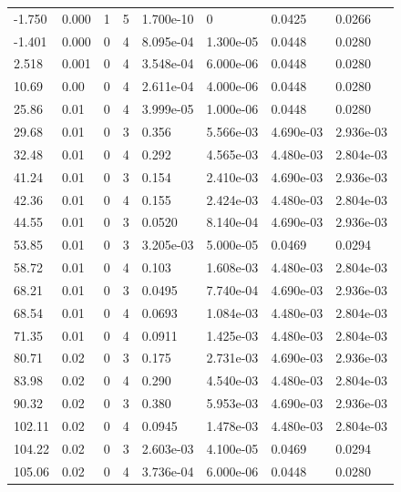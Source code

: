 \documentclass[preview]{standalone}
\begin{document}
{{\begin{tabular}{L{1.2cm}C{1.2cm} C{0.3cm}C{0.5cm} C{1.4cm}C{1.4cm} C{1.4cm}C{1.4cm}}
  -1.750  &  0.000  & 1     &  5 &  1.700e-10  & 0  & 0.0425 &  0.0266   \\ 
  -1.401  &  0.000  & 0     &  4 &  8.095e-04  & 1.300e-05  & 0.0448 &  0.0280   \\ 
  2.518  &  0.001  & 0     &  4 &  3.548e-04  & 6.000e-06  & 0.0448 &  0.0280   \\ 
  10.69  &  0.00  & 0     &  4 &  2.611e-04  & 4.000e-06  & 0.0448 &  0.0280   \\ 
  25.86  &  0.01  & 0     &  4 &  3.999e-05  & 1.000e-06  & 0.0448 &  0.0280   \\ 
  29.68  &  0.01  & 0     &  3 &  0.356  & 5.566e-03  & 4.690e-03 &  2.936e-03   \\ 
  32.48  &  0.01  & 0     &  4 &  0.292  & 4.565e-03  & 4.480e-03 &  2.804e-03   \\ 
  41.24  &  0.01  & 0     &  3 &  0.154  & 2.410e-03  & 4.690e-03 &  2.936e-03   \\ 
  42.36  &  0.01  & 0     &  4 &  0.155  & 2.424e-03  & 4.480e-03 &  2.804e-03   \\ 
  44.55  &  0.01  & 0     &  3 &  0.0520  & 8.140e-04  & 4.690e-03 &  2.936e-03   \\ 
  53.85  &  0.01  & 0     &  3 &  3.205e-03  & 5.000e-05  & 0.0469 &  0.0294   \\ 
  58.72  &  0.01  & 0     &  4 &  0.103  & 1.608e-03  & 4.480e-03 &  2.804e-03   \\ 
  68.21  &  0.01  & 0     &  3 &  0.0495  & 7.740e-04  & 4.690e-03 &  2.936e-03   \\ 
  68.54  &  0.01  & 0     &  4 &  0.0693  & 1.084e-03  & 4.480e-03 &  2.804e-03   \\ 
  71.35  &  0.01  & 0     &  4 &  0.0911  & 1.425e-03  & 4.480e-03 &  2.804e-03   \\ 
  80.71  &  0.02  & 0     &  3 &  0.175  & 2.731e-03  & 4.690e-03 &  2.936e-03   \\ 
  83.98  &  0.02  & 0     &  4 &  0.290  & 4.540e-03  & 4.480e-03 &  2.804e-03   \\ 
  90.32  &  0.02  & 0     &  3 &  0.380  & 5.953e-03  & 4.690e-03 &  2.936e-03   \\ 
  102.11  &  0.02  & 0     &  4 &  0.0945  & 1.478e-03  & 4.480e-03 &  2.804e-03   \\ 
  104.22  &  0.02  & 0     &  3 &  2.603e-03  & 4.100e-05  & 0.0469 &  0.0294   \\ 
  105.06  &  0.02  & 0     &  4 &  3.736e-04  & 6.000e-06  & 0.0448 &  0.0280   \\ 

\end{tabular}}}
\end{document}
